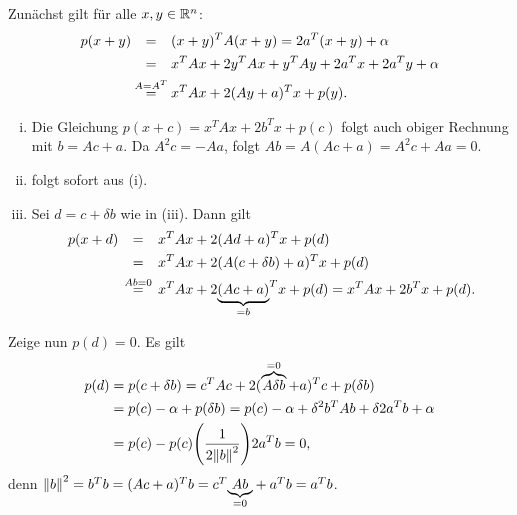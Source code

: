 \begin{beweis}
	Zunächst gilt für alle $x,y\in \mathbb{R}^n$:
	\begin{align*}
		p(x+y) &\stack{}{=} (x+y)^T A (x+y) = 2a^T(x+y) + \alpha \\
		&\stack{}{=} x^T Ax + 2y^T Ax + y^T Ay + 2a^Tx + 2a^Ty + \alpha \\
		&\stack{A=A^T}{=} x^TAx + 2(Ay + a)^Tx + p(y).
	\end{align*}
	\begin{enumerate}[(i)]
		\item Die Gleichung $p(x+c) = x^TAx + 2b^Tx + p(c)$ folgt auch obiger Rechnung mit $b = Ac+a$.
		Da $A^2c = -Aa$, folgt $Ab = A(Ac + a) = A^2c + Aa = 0$.
		\item folgt sofort aus (i).
		\item Sei $d = c + \delta b$ wie in (iii).
		Dann gilt
		\begin{align*}
			p(x+d)& \stack{}{=} x^TAx + 2(Ad+a)^T x + p(d) \\
			&\stack{}{=} x^TAx + 2(A(c+\delta b) + a)^T x + p(d) \\
			&\stack{Ab=0}{=} x^TAx + 2\Underbrace{(Ac+a)}{=b}^Tx + p(d) = x^TAx + 2b^Tx + p(d).
		\end{align*}
	\end{enumerate}
	Zeige nun $p(d) = 0$.
	Es gilt
	\begin{align*}
		p(d) &= p(c+\delta b) = c^TAc + 2(\overbrace{A\delta b}^{\mathclap{=0}}+a)^T c + p(\delta b) \\
		&= p(c) - \alpha + p(\delta b) = p(c) - \alpha + \delta^2 b^TAb + \delta 2 a^T b + \alpha \\
		&= p(c) - p(c) \enb{\frac{1}{2 \no{b}^2}} 2a^Tb = 0,
	\end{align*}
	denn $\left\lVert b\right\rVert^2 = b^Tb = (Ac+a)^Tb = c^T{\underbrace{Ab}_{=0}} + a^Tb = a^Tb$. \qedhere
\end{beweis}

\newpage

